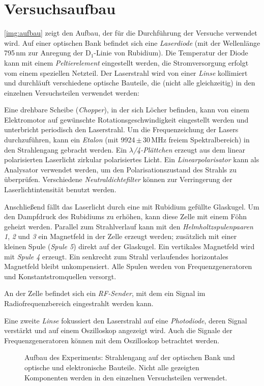 \section{Versuchsaufbau}
\autoref{img:aufbau} zeigt den Aufbau, der für die Durchführung der Versuche
verwendet wird.
Auf einer optischen Bank befindet sich eine \emph{Laserdiode} (mit der Wellenlänge
795\,nm zur Anregung der D$_1$-Linie von Rubidium).
Die Temperatur der Diode kann mit einem \emph{Peltierelement} eingestellt werden,
die Stromversorgung erfolgt vom einem speziellen Netzteil.
Der Laserstrahl wird von einer \emph{Linse} kollimiert und durchläuft verschiedene
optische Bauteile, die (nicht alle gleichzeitig) in den einzelnen Versuchsteilen
verwendet werden:

Eine drehbare Scheibe (\emph{Chopper}), in der sich Löcher befinden, kann von
einem Elektromotor auf gewünschte Rotationsgeschwindigkeit eingestellt werden und unterbricht periodisch
den Laserstrahl.
Um die Fre\-quenz\-eich\-ung der Lasers durchzuführen, kann ein \emph{Etalon}
(mit 9924\,$\pm$\,30\,MHz freiem Spektralbereich) in den Strahlengang gebracht werden.
Ein \emph{$\lambda$/4-Plättchen} erzeugt aus dem linear polarisierten Laserlicht zirkular polarisiertes Licht.
Ein \emph{Linearpolarisator} kann als Analysator verwendet werden, um den Polarisationszustand
des Strahls zu überprüfen. Verschiedene \emph{Neutraldichtefilter} können zur Verringerung der Laserlichtintensität
benutzt werden.

Anschließend fällt das Laserlicht durch eine mit Rubidium gefüllte Glaskugel.
Um den Dampfdruck des Rubidiums zu erhöhen, kann diese Zelle mit einem Föhn geheizt werden.
Parallel zum Strahlverlauf kann mit den \emph{Helmholtzspulenpaaren 1}, \emph{2} und \emph{3}
ein Magnetfeld in der Zelle erzeugt werden;
zusätzlich mit einer kleinen Spule (\emph{Spule 5}) direkt auf der Glaskugel.
Ein vertikales Magnetfeld wird mit \emph{Spule 4} erzeugt.
Ein senkrecht zum Strahl verlaufendes horizontales Magnetfeld bleibt unkompensiert.
Alle Spulen werden von Frequenzgeneratoren und Konstantstromquellen versorgt.

An der Zelle befindet sich ein \emph{RF-Sender}, mit dem ein Signal im Radiofrequenzbereich eingestrahlt werden kann.

Eine zweite \emph{Linse} fokussiert den Laserstrahl auf eine \emph{Photodiode}, deren Signal verstärkt und auf
einem Oszilloskop angezeigt wird.
Auch die Signale der Frequenzgeneratoren können mit dem Oszilloskop betrachtet werden.


\begin{landscape}

\begin{figure}[H]
        \def\svgwidth{1.4\textwidth}
        
        \caption{Aufbau des Experiments: Strahlengang auf der optischen Bank
        und optische und elektronische Bauteile.
        Nicht alle gezeigten Komponenten werden in den einzelnen
        Versuchsteilen verwendet.}
        \label{img:aufbau}
\end{figure}

\end{landscape}
